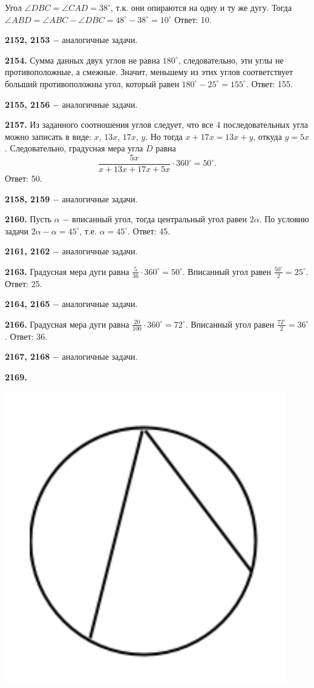 Угол $\angle DBC = \angle CAD = 38^\circ$, т.к. они опираются на одну и ту же дугу. Тогда $\angle ABD = \angle ABC - \angle DBC = 48^\circ - 38^\circ=10^\circ$ \newline \null \hspace*{\fill} Ответ: 10.

\textbf{2152, 2153} $-$ аналогичные задачи.

\textbf{2154.} Сумма данных двух углов не равна $180^\circ$, следовательно, эти углы не противоположные, а смежные. Значит, меньшему из этих углов соответствует больший противоположны угол, который равен $180^\circ-25^\circ=155^\circ$.\newline \null \hspace*{\fill} Ответ: 155.

\textbf{2155, 2156} $-$ аналогичные задачи.

\textbf{2157.} Из заданного соотношения углов следует, что все 4 последовательных угла  можно записать в виде: $x$, $13x$, $17x$, $y$. Но тогда $x+17x=13x+y$, откуда $y=5x$. Следовательно, градусная мера угла $D$ равна
\[
\frac{5x}{x+13x+17x+5x}\cdot360^\circ=50^\circ.
\]\null \hspace*{\fill} Ответ: 50.

\textbf{2158, 2159} $-$ аналогичные задачи.

\textbf{2160.} Пусть $\alpha$ $-$ вписанный угол, тогда центральный угол равен $2\alpha$. По условию задачи $2\alpha - \alpha = 45^\circ$, т.е. $\alpha = 45^\circ$. \newline \null \hspace*{\fill} Ответ: 45.

\textbf{2161, 2162} $-$ аналогичные задачи.

\textbf{2163.} Градусная мера дуги равна $\frac{5}{36}\cdot360^\circ=50^\circ$. Вписанный угол равен $\frac{50^\circ}{2} = 25^\circ$. \newline \null \hspace*{\fill} Ответ: 25.

\textbf{2164, 2165} $-$ аналогичные задачи.

\textbf{2166.} Градусная мера дуги равна $\frac{20}{100}\cdot360^\circ=72^\circ$. Вписанный угол равен $\frac{72^\circ}{2} = 36^\circ$. \newline \null \hspace*{\fill} Ответ: 36.

\textbf{2167, 2168} $-$ аналогичные задачи.

\textbf{2169.}

{\centering \includegraphics[width=0.35\linewidth]{Geometry/Content/45.png}
	
}

